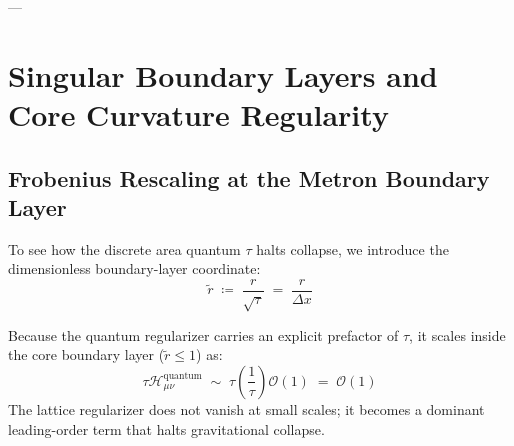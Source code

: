 \documentclass[
    12pt,
    a4paper,
    headings=normal,
    twoside=false,
    open=any,
    parskip=half
]{scrbook}
\begin{document}
---

\section{Singular Boundary Layers and Core Curvature Regularity}
\label{sec:ch3_boundary_layer_analysis}

\subsection{Frobenius Rescaling at the Metron Boundary Layer}

To see how the discrete area quantum $\tau$ halts collapse, we introduce the dimensionless boundary-layer coordinate:
\begin{equation}
\tilde{r} \;\coloneqq\; \frac{r}{\sqrt{\tau}} \;=\; \frac{r}{\Delta x}
\label{eq:ch3_rescaled_coordinate}
\end{equation}

Because the quantum regularizer carries an explicit prefactor of $\tau$, it scales inside the core boundary layer ($\tilde{r} \le 1$) as:
\begin{equation}
\tau \mathcal{H}_{\mu\nu}^{\text{quantum}} \;\sim\; \tau \left( \frac{1}{\tau} \right) \mathcal{O}(1) \;=\; \mathcal{O}(1)
\end{equation}
The lattice regularizer does not vanish at small scales; it becomes a dominant leading-order term that halts gravitational collapse.
\end{document}
